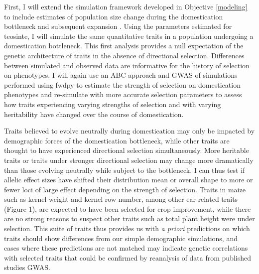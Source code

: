 First, I will extend the simulation framework developed in Objective \ref{modeling} to include estimates of population size change during the domestication bottleneck and subsequent expansion \citep{Wright:2005}. Using the parameters estimated for teosinte, I will simulate the same quantitative traits in a population undergoing a domestication bottleneck. This first analysis provides a null expectation of the genetic architecture of traits in the absence of directional selection. Differences between simulated and observed \citep[][and our own on-going analyses---see Data Management Plan]{Wallace:2014} data are informative for the history of selection on phenotypes. I will again use an ABC approach and GWAS of simulations performed using fwdpy to estimate the strength of selection on domestication phenotypes and re-simulate with more accurate selection parameters to assess how traits experiencing varying strengths of selection and with varying heritability have changed over the course of domestication.


Traits believed to evolve neutrally during domestication may only be impacted by demographic forces of the domestication bottleneck, while other traits are thought to have experienced directional selection simultaneously. More heritable traits or traits under stronger directional selection may change more dramatically than those evolving neutrally while subject to the bottleneck. I can thus test if allelic effect sizes have shifted  their distribution mean or overall shape to more or fewer loci of large effect \citep{Chevin:2008} depending on the strength of selection. Traits in maize such as kernel weight and kernel row number, among other ear-related traits (Figure 1), are expected to have been selected for crop improvement, while there are no strong reasons to suspect other traits such as total plant height were under selection. This suite of traits thus provides us with \emph{a priori} predictions on which traits should show differences from our simple demographic simulations, and cases where these predictions are not matched may indicate genetic correlations with selected traits that could be confirmed by reanalysis of data from published studies GWAS. 

